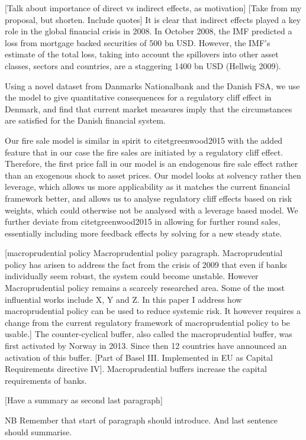 \documentclass[11pt]{article}
\begin{document}
[Talk about importance of direct vs indirect effects, as motivation]
[Take from my proposal, but shorten. Include quotes]
It is clear that indirect effects played a key role in the global financial crisis in 2008. In October 2008, the IMF predicted a loss from mortgage backed securities of 500 bn USD. However, the IMF’s estimate of the total loss, taking into account the spillovers into other asset classes, sectors and countries, are a staggering 1400 bn USD (Hellwig 2009).

Using a novel dataset from Danmarks Nationalbank and the Danish FSA, we use the model to give quantitative consequences for a regulatory cliff effect in Denmark, and find that current market measures imply that the circumstances are satisfied for the Danish financial system.

Our fire sale model is similar in spirit to citet{greenwood2015} with the added feature that in our case the fire sales are initiated by a regulatory cliff effect. Therefore, the first price fall in our model is an endogenous fire sale effect rather than an exogenous shock to asset prices. Our model looks at solvency rather then leverage, which allows us more applicability as it matches the current financial framework better, and allows us to analyse regulatory cliff effects based on risk weights, which could otherwise not be analysed with a leverage based model. We further deviate from citet{greenwood2015} in allowing for further round sales, essentially including more feedback effects by solving for a new steady state.

[macroprudential policy
Macroprudential policy paragraph. Macroprudential policy has arisen to address the fact from the crisis of 2009 that even if banks individually seem robust, the system could become unstable.
However Macroprudential policy remains a scarcely researched area. Some of the most influential works include X, Y and Z. In this paper I address how macroprudential policy can be used to reduce systemic risk. It however requires a change from the current regulatory framework of macroprudential policy to be usable.]
The counter-cyclical buffer, also called the macroprudential buffer, was first activated by Norway in 2013. Since then 12 countries have announced an activation of this buffer. [Part of Basel III. Implemented in EU as Capital Requirements directive IV]. Macroprudential buffers increase the capital requirements of banks.

[Have a summary as second last paragraph]


NB Remember that start of paragraph should introduce. And last sentence should summarise.
\end{document}
